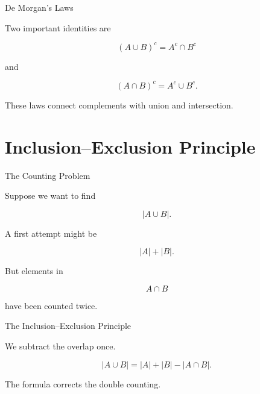 \documentclass[aspectratio=169,11pt]{beamer}
\begin{document}

\begin{frame}{De Morgan's Laws}

Two important identities are

\[
\boxed{
(A\cup B)^c=A^c\cap B^c
}
\]

and

\[
\boxed{
(A\cap B)^c=A^c\cup B^c.
}
\]

\vspace{0.4cm}

These laws connect complements with union and intersection.

\end{frame}


\section{Inclusion--Exclusion Principle}


\begin{frame}{The Counting Problem}

Suppose we want to find

\[
|A\cup B|.
\]

A first attempt might be

\[
|A|+|B|.
\]

\vspace{0.35cm}

But elements in

\[
A\cap B
\]

have been counted twice.

\end{frame}


\begin{frame}{The Inclusion--Exclusion Principle}

We subtract the overlap once.

\[
\boxed{
|A\cup B|
=
|A|+|B|-|A\cap B|.
}
\]

\vspace{0.45cm}

The formula corrects the double counting.

\end{frame}
\end{document}
